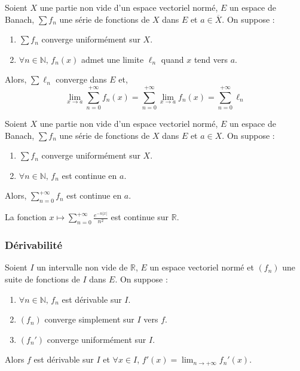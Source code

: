 	
	\begin{theorem}
		Soient $X$ une partie non vide d'un espace vectoriel normé, $E$ un espace de Banach, $\sum f_n$ une série de fonctions de $X$ dans $E$ et $a \in \overline{X}$. On suppose :
		\begin{enumerate}[label=(\roman*)]
			\item $\sum f_n$ converge uniformément sur $X$.
			\item $\forall n \in \mathbb{N}, \, f_n(x)$ admet une limite $\ell_n$ quand $x$ tend vers $a$.
		\end{enumerate}
		Alors, $\sum \ell_n$ converge dans $E$ et,
		\[ \lim_{x \rightarrow a} \sum_{n=0}^{+\infty} f_n(x) = \sum_{n=0}^{+\infty} \lim_{x \rightarrow a} f_n(x) = \sum_{n=0}^{+\infty} \ell_n \]
	\end{theorem}
	
	\begin{theorem}
		Soient $X$ une partie non vide d'un espace vectoriel normé, $E$ un espace de Banach, $\sum f_n$ une série de fonctions de $X$ dans $E$ et $a \in X$. On suppose :
		\begin{enumerate}[label=(\roman*)]
			\item $\sum f_n$ converge uniformément sur $X$.
			\item $\forall n \in \mathbb{N}, \, f_n$ est continue en $a$.
		\end{enumerate}
		Alors, $\sum_{n=0}^{+\infty} f_n$ est continue en $a$.
	\end{theorem}
	
	\begin{example}
		La fonction $x \mapsto \sum_{n=0}^{+\infty} \frac{e^{-n\vert x \vert}}{n^2}$ est continue sur $\mathbb{R}$.
	\end{example}
	
	\subsubsection{Dérivabilité}
	
	\reference{148}
	
	\begin{theorem}
		Soient $I$ un intervalle non vide de $\mathbb{R}$, $E$ un espace vectoriel normé et $(f_n)$ une suite de fonctions de $I$ dans $E$. On suppose :
		\begin{enumerate}[label=(\roman*)]
			\item $\forall n \in \mathbb{N}, \, f_n$ est dérivable sur $I$.
			\item $(f_n)$ converge simplement sur $I$ vers $f$.
			\item $(f_n')$ converge uniformément sur $I$.
		\end{enumerate}
		Alors $f$ est dérivable sur $I$ et $\forall x \in I$, $f'(x) = \lim_{n \rightarrow +\infty} f_n'(x)$.
	\end{theorem}
	
